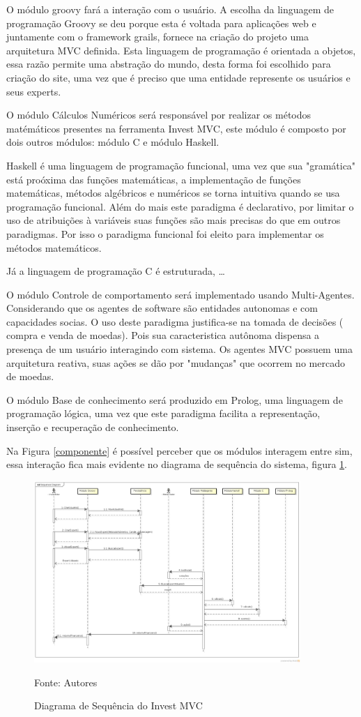 O módulo groovy fará a interação com o usuário. A escolha da linguagem de programação Groovy se deu porque esta é voltada para aplicações web e juntamente com  o framework grails, fornece na criação do projeto uma arquitetura MVC definida. Esta linguagem de programação é orientada a objetos, essa razão permite uma abstração do mundo, desta forma foi escolhido para  criação do site, uma vez que é preciso que uma entidade represente os usuários e seus experts.

O módulo Cálculos Numéricos será responsável por realizar os métodos matémáticos presentes na ferramenta Invest MVC, este módulo é composto por dois outros módulos: módulo C e módulo Haskell.

Haskell é uma linguagem de programação funcional, uma vez que sua "gramática" está proóxima das funções matemáticas, a implementação de funções matemáticas, métodos algébricos e numéricos se torna intuitiva quando se usa programação funcional. Além do mais este paradigma é declarativo, por limitar o uso de atribuições à variáveis suas funções são mais precisas do que em outros paradigmas. Por isso o paradigma funcional foi eleito para implementar os métodos matemáticos.

Já a linguagem de programação C é estruturada, …

O módulo Controle de comportamento será implementado usando Multi-Agentes. Considerando que os agentes de software são entidades autonomas e com capacidades socias. O uso deste paradigma justifica-se na tomada de decisões ( compra e venda de moedas). Pois sua  caracteristica autônoma dispensa a presença de um usuário interagindo com sistema. Os agentes MVC possuem uma arquitetura reativa, suas ações se dão por "mudanças" que ocorrem no  mercado de moedas.

O módulo Base de conhecimento será produzido em Prolog, uma linguagem de programação lógica,  uma vez que este  paradigma facilita a representação, inserção e recuperação de conhecimento.

Na Figura \ref{componente} é possível perceber que os módulos interagem entre sim, essa interação fica mais evidente no diagrama de sequência do sistema, figura \ref{sequencia}.

\begin{figure}[htp]
\centering
\includegraphics[width=0.9\textwidth]{figuras/sequencia}
\caption{Diagrama de Sequência do Invest MVC}{Fonte: Autores} 
\label{sequencia}
\end{figure}


